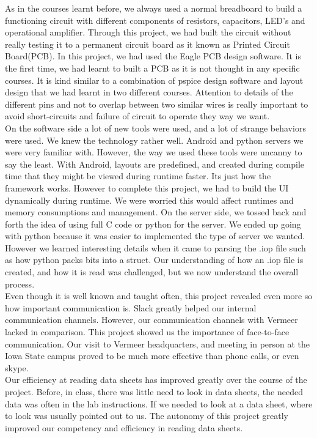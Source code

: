 \documentclass[paper=a4, fontsize=11pt]{scrartcl}
\numberwithin{equation}{section}		%
\numberwithin{figure}{section}			%
\numberwithin{table}{section}				%
\begin{document}
As in the courses learnt before, we always used a normal breadboard to build a functioning circuit with different components of resistors, capacitors, LED's and operational amplifier. Through this project, we had built the circuit without really testing it to a permanent circuit board as it known as Printed Circuit Board(PCB). In this project, we had used the Eagle PCB design software. It is the first time, we had learnt to built a PCB as it is not thought in any specific courses. It is kind similar to a combination of pspice design software and layout design that we had learnt in two different courses. Attention to details of the different pins and not to overlap between two similar wires is really important to avoid short-circuits and failure of circuit to operate they way we want.\\

On the software side a lot of new tools were used, and a lot of strange behaviors were used. We knew the technology rather well. Android and python servers we were very familiar with. However, the way we used these tools were uncanny to say the least. With Android, layouts are predefined, and created during compile time that they might be viewed during runtime faster. Its just how the framework works. However to complete this project, we had to build the UI dynamically during runtime. We were worried this would affect runtimes and memory consumptions and management. On the server side, we tossed back and forth the idea of using full C code or python for the server. We ended up going with python because it was easier to implemented the type of server we wanted. However we learned interesting details when it came to parsing the .iop file such as how python packs bits into a struct. Our understanding of how an .iop file is created, and how it is read was challenged, but we now understand the overall process.\\

Even though it is well known and taught often, this project revealed even more so how important communication is. Slack greatly helped our internal communication channels. However, our communication channels with Vermeer lacked in comparison. This project showed us the importance of face-to-face communication. Our visit to Vermeer headquarters, and meeting in person at the Iowa State campus proved to be much more effective than phone calls, or even skype.\\

Our efficiency at reading data sheets has improved greatly over the course of the project. Before, in class, there was little need to look in data sheets, the needed data was often in the lab instructions. If we needed to look at a data sheet, where to look was usually pointed out to us. The autonomy of this project greatly improved our competency and efficiency in reading data sheets.\\
\end{document}

